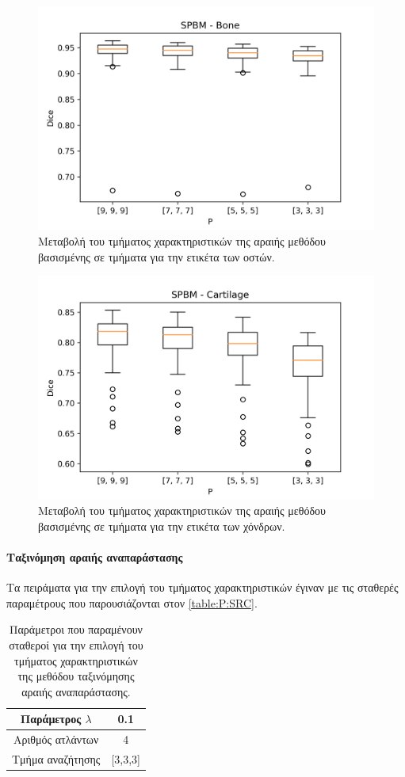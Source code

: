 \documentclass[a4paper,12pt]{article}
\newcommand{\paragraphLine}[1]{\paragraph{#1}\mbox{}}
\begin{document}
\begin{figure}[H]
    \centering
    \includegraphics[width=0.85\linewidth]{SPBM_P_Bone_plot.png}
    \caption{Μεταβολή του τμήματος χαρακτηριστικών της αραιής μεθόδου βασισμένης
             σε τμήματα για την ετικέτα των οστών.}
    \label{fig:SPBM:P:2}
\end{figure}

\begin{figure}[H]
    \centering
    \includegraphics[width=0.85\linewidth]{SPBM_P_Cartilage_plot.png}
    \caption{Μεταβολή του τμήματος χαρακτηριστικών της αραιής μεθόδου βασισμένης
             σε τμήματα για την ετικέτα των χόνδρων.}
    \label{fig:SPBM:P:3}
\end{figure}

\paragraphLine{Ταξινόμηση αραιής αναπαράστασης}

Τα πειράματα για την επιλογή του τμήματος χαρακτηριστικών έγιναν με τις σταθερές
παραμέτρους που παρουσιάζονται στον \autoref{table:P:SRC}.

\begin{table}[h!]
    \centering
    \begin{tabular}{|c|c|} 
        \hline
        Παράμετρος $\lambda$ & 0.1 \\ 
        \hline
        Αριθμός ατλάντων & 4 \\ 
        \hline
        Τμήμα αναζήτησης & [3,3,3] \\ 
        \hline
    \end{tabular}
    \caption{Παράμετροι που παραμένουν σταθεροί για την επιλογή του τμήματος
             χαρακτηριστικών της μεθόδου ταξινόμησης αραιής αναπαράστασης.}
    \label{table:P:SRC}
\end{table}
\end{document}
